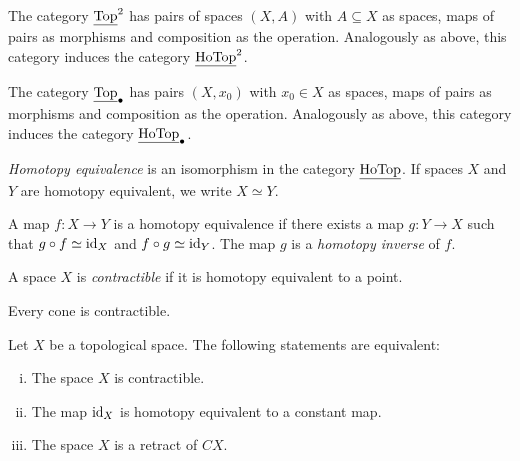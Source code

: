 \begin{definicija}
The category $\underline{\operatorname{Top}}^2$ has pairs of spaces $(X, A)$ with
$A \subseteq X$ as spaces, maps of pairs as morphisms and
composition as the operation. Analogously as above, this category
induces the category $\underline{\operatorname{HoTop}}^2$.
\end{definicija}

\begin{definicija}
The category $\underline{\operatorname{Top}}_\bullet$ has pairs $(X, x_0)$ with
$x_0 \in X$ as spaces, maps of pairs as morphisms and composition
as the operation. Analogously as above, this category induces the
category $\underline{\operatorname{HoTop}}_\bullet$.
\end{definicija}

\begin{definicija}
\emph{Homotopy equivalence} is an
isomorphism in the category $\underline{\operatorname{HoTop}}$. If spaces $X$ and $Y$
are homotopy equivalent, we write $X \simeq Y$.
\end{definicija}

\begin{opomba}
A map $f \colon X \to Y$ is a homotopy equivalence if there exists
a map $g \colon Y \to X$ such that $g \circ f \simeq \operatorname{id}_X$ and
$f \circ g \simeq \operatorname{id}_Y$. The map $g$ is a
\emph{homotopy inverse} of $f$.
\end{opomba}

\begin{definicija}
A space $X$ is \emph{contractible} if
it is homotopy equivalent to a point.
\end{definicija}

\begin{opomba}
Every cone is contractible.
\end{opomba}

\begin{trditev}
Let $X$ be a topological space. The following statements are
equivalent:

\begin{enumerate}[i)]
\item The space $X$ is contractible.
\item The map $\operatorname{id}_X$ is homotopy equivalent to a constant map.
\item The space $X$ is a retract of $CX$.
\end{enumerate}
\end{trditev}

\obvs

